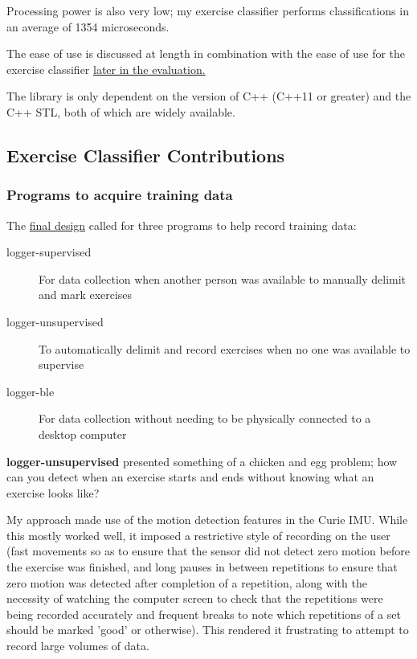 \documentclass[a4paper]{article}
\begin{document}
Processing power is also very low; my exercise classifier performs classifications in an average of 1354 microseconds\cite{dsref0}.

The ease of use is discussed at length in combination with the ease of use for the exercise classifier \hyperref[subsec:ev_eu]{later in the evaluation.}

The library is only dependent on the version of C++ (C++11 or greater) and the C++ STL, both of which are widely available. 

\newpage
\subsection{Exercise Classifier Contributions}%
\label{subsec:ev_cl}

\subsubsection{Programs to acquire training data}
\label{subsubsec:ev_cl_training}

The \hyperref[subsec:dc_msa]{final design} called for three programs to help record training data:

\begin{description}
\item[logger-supervised] For data collection when another person was available to manually delimit and mark exercises
\item[logger-unsupervised] To automatically delimit and record exercises when no one was available to supervise
\item[logger-ble] For data collection without needing to be physically connected to a desktop computer
\end{description}

\label{para:ev_cl_loggerunsupervised}
\textbf{logger-unsupervised} presented something of a chicken and egg problem; how can you detect when an exercise starts and ends without knowing what an exercise looks like?

My approach made use of the motion detection features in the Curie IMU. 
While this mostly worked well, it imposed a restrictive style of recording on the user (fast movements so as to ensure that the sensor did not detect zero motion before the exercise was finished, and long pauses in between repetitions to ensure that zero motion was detected after completion of a repetition, along with the necessity of watching the computer screen to check that the repetitions were being recorded accurately and frequent breaks to note which repetitions of a set should be marked 'good' or otherwise). This rendered it frustrating to attempt to record large volumes of data.
\end{document}
